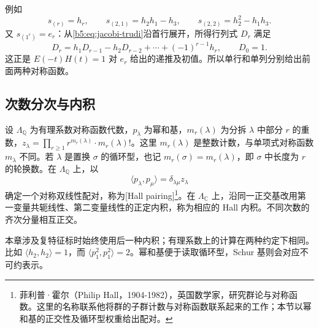 例如
\[
	s_{(r)}=h_r,\qquad s_{(2,1)}=h_2h_1-h_3,\qquad s_{(2,2)}=h_2^2-h_1h_3.
\]
又 \(s_{(1^r)}=e_r\)：从\eqref{b5:eq:jacobi-trudi}沿首行展开，所得行列式 \(D_r\) 满足
\[
	D_r=h_1D_{r-1}-h_2D_{r-2}+\cdots+(-1)^{r-1}h_r,\qquad D_0=1.
\]
这正是 \(E(-t)H(t)=1\) 对 \(e_r\) 给出的递推及初值。所以单行和单列分别给出前面两种对称函数。

\subsection{次数分次与内积}
\label{b5:subsec:0701:03}

\begin{definition}\label{b5:def:hall-inner-product}
	设 \(\Lambda_{\mathbb Q}\) 为有理系数对称函数代数，\(p_\lambda\) 为幂和基，\(m_r(\lambda)\) 为分拆 \(\lambda\) 中部分 \(r\) 的重数，\(z_\lambda=\prod_{r\ge1}r^{m_r(\lambda)}\cdot m_r(\lambda)!\)。这里 \(m_r(\lambda)\) 是整数计数，与单项式对称函数 \(m_\lambda\) 不同。若 \(\lambda\) 是置换 \(\sigma\) 的循环型，也记 \(m_r(\sigma)=m_r(\lambda)\)，即 \(\sigma\) 中长度为 \(r\) 的轮换数。在 \(\Lambda_{\mathbb Q}\) 上，以
	\[
		\langle p_\lambda,p_\mu\rangle=\delta_{\lambda\mu}z_\lambda
	\]
	确定一个对称双线性配对，称为[Hall pairing]\footnote{菲利普·霍尔（Philip Hall，1904-1982），英国数学家，研究群论与对称函数。这里的名称联系他将群的子群计数与对称函数联系起来的工作；本节以幂和基的正交性及循环型权重给出配对。}。在 \(\Lambda_{\mathbb C}\) 上，沿同一正交基改用第一变量共轭线性、第二变量线性的正定内积，称为相应的 Hall 内积。不同次数的齐次分量相互正交。
\end{definition}

本章涉及复特征标时始终使用后一种内积；有理系数上的计算在两种约定下相同。比如 \(\langle h_2,h_2\rangle=1\)，而 \(\langle p_1^2,p_1^2\rangle=2\)。幂和基便于读取循环型，Schur 基则会对应不可约表示。

